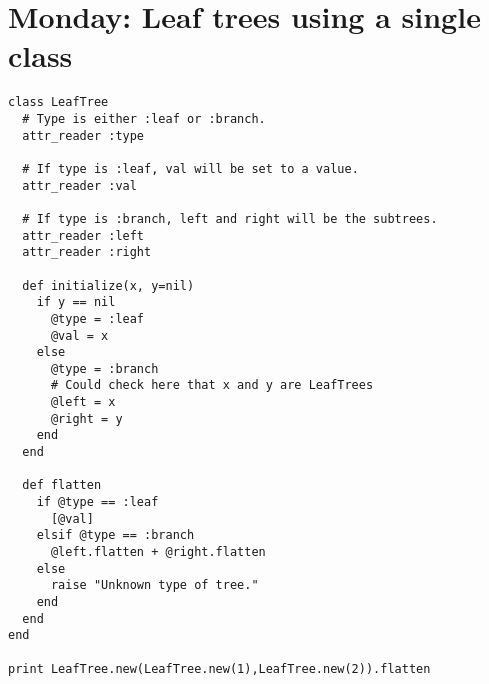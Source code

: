 \documentclass[11pt]{article}
\begin{document}
\section{Monday: Leaf trees using a single class}
\label{sec:org9a630fc}
\begin{verbatim}
class LeafTree
  # Type is either :leaf or :branch.
  attr_reader :type

  # If type is :leaf, val will be set to a value.
  attr_reader :val

  # If type is :branch, left and right will be the subtrees.
  attr_reader :left
  attr_reader :right

  def initialize(x, y=nil)
    if y == nil
      @type = :leaf
      @val = x
    else
      @type = :branch
      # Could check here that x and y are LeafTrees
      @left = x
      @right = y
    end
  end

  def flatten
    if @type == :leaf
      [@val]
    elsif @type == :branch
      @left.flatten + @right.flatten
    else
      raise "Unknown type of tree."
    end
  end
end

print LeafTree.new(LeafTree.new(1),LeafTree.new(2)).flatten
\end{verbatim}
\end{document}
